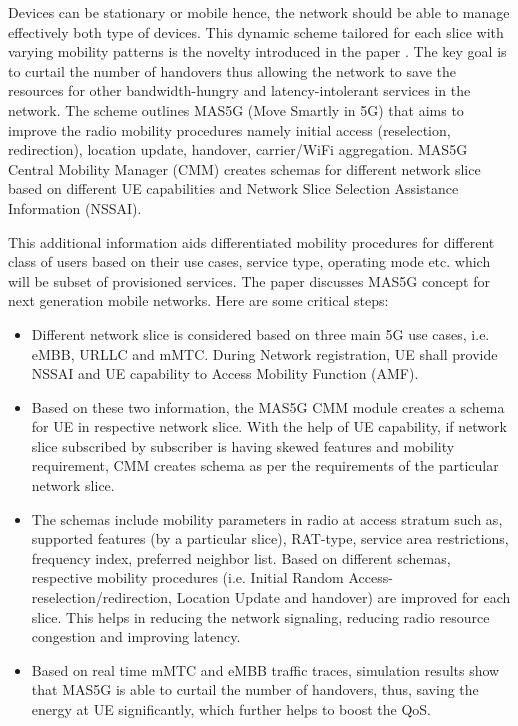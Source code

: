 \begin{multicols}{2}
Devices can be stationary or mobile hence, the network should be able to manage effectively both type of devices. This dynamic scheme tailored for each slice with varying mobility patterns is the novelty introduced in the paper \cite{art1-key01}. The key goal is to curtail the number of handovers thus allowing the network to save the resources for other bandwidth-hungry and latency-intolerant services in the network. The scheme outlines MAS5G (Move Smartly in 5G) that aims to improve the radio mobility procedures  namely initial access (reselection, redirection), location update, handover, carrier/WiFi aggregation. MAS5G Central Mobility Manager (CMM) creates schemas for different network slice based on different UE capabilities and Network Slice Selection Assistance Information (NSSAI). 

This additional information aids differentiated mobility procedures for different class of users based on their use cases, service type, operating mode etc. which will be subset of provisioned services. The paper discusses MAS5G concept for next generation mobile networks. Here are some critical steps:

\begin{itemize}

\item Different network slice is considered based on three main 5G use cases, i.e. eMBB, URLLC and mMTC. During Network registration, UE shall provide NSSAI and UE capability to Access Mobility Function  (AMF).

\item Based on these two information, the MAS5G CMM  module creates a schema for UE in respective network  slice. With the help of UE capability, if network slice subscribed by subscriber is having skewed features and mobility requirement, CMM creates schema as per the requirements of the particular network slice. 

\item The schemas include mobility parameters in radio at access stratum such as, supported features (by a particular slice), RAT-type, service area restrictions, frequency index, preferred neighbor list. Based on different schemas, respective mobility procedures (i.e. Initial Random Access-reselection/redirection, Location Update and handover) are improved for each slice. This helps in reducing the network signaling, reducing radio resource congestion and improving latency. 

\item Based on real time mMTC and eMBB traffic traces, simulation results show that MAS5G is able to curtail the number of handovers, thus, saving the energy at UE significantly, which further helps to boost the QoS.


\end{itemize}
\end{multicols}
